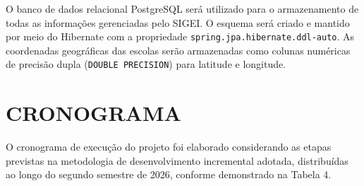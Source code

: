 \documentclass[12pt,a4paper,oneside]{abntspiifac}
\begin{document}
O banco de dados relacional PostgreSQL será utilizado para o armazenamento de todas as informações gerenciadas pelo SIGEI. O esquema será criado e mantido por meio do Hibernate com a propriedade \texttt{spring.jpa.hibernate.ddl-auto}. As coordenadas geográficas das escolas serão armazenadas como colunas numéricas de precisão dupla (\texttt{DOUBLE PRECISION}) para latitude e longitude.






\chapter{CRONOGRAMA}
\label{cap:cronograma}

O cronograma de execução do projeto foi elaborado considerando as etapas previstas na metodologia de desenvolvimento incremental adotada, distribuídas ao longo do segundo semestre de 2026, conforme demonstrado na Tabela 4.
\end{document}
